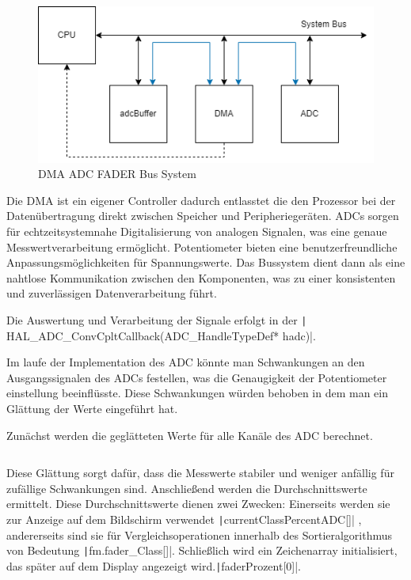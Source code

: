 \begin{figure}[H]
\centering
\includegraphics[width=1.0\textwidth]{images/08_durchfuehrung/interface/DMA_ADC_MEM.drawio.png}
\caption{DMA ADC FADER Bus System}
\label{fig:DMA ADC FADER}
\end{figure}

Die DMA ist ein eigener Controller dadurch entlasstet die den Prozessor bei der Datenübertragung direkt zwischen Speicher und Peripheriegeräten.
ADCs sorgen für echtzeitsystemnahe Digitalisierung von analogen Signalen, was eine genaue Messwertverarbeitung ermöglicht. Potentiometer bieten eine benutzerfreundliche Anpassungsmöglichkeiten für Spannungswerte. Das Bussystem dient dann als eine nahtlose Kommunikation zwischen den Komponenten, was zu einer konsistenten und zuverlässigen Datenverarbeitung führt.

\newpage
Die Auswertung und Verarbeitung der Signale erfolgt in der  \texttt| HAL_ADC_ConvCpltCallback(ADC_HandleTypeDef* hadc)|.

Im laufe der Implementation des ADC könnte man Schwankungen an den Ausgangssignalen des ADCs festellen, was die Genaugigkeit der Potentiometer einstellung beeinflüsste. Diese Schwankungen würden behoben in dem man ein Glättung der Werte eingeführt hat.

Zunächst werden die geglätteten Werte für alle Kanäle des ADC berechnet.

 \inputminted[firstline=121, lastline=135]{c}{../../f401_display_encoder_fader_test/Core/Src/interface.c}

Diese Glättung sorgt dafür, dass die Messwerte stabiler und weniger anfällig für zufällige Schwankungen sind. Anschließend werden die Durchschnittswerte ermittelt. Diese Durchschnittswerte dienen zwei Zwecken: Einerseits werden sie zur Anzeige auf dem Bildschirm verwendet  \texttt|currentClassPercentADC[]|
, andererseits sind sie für Vergleichsoperationen innerhalb des Sortieralgorithmus von Bedeutung  \texttt|fm.fader_Class[]|.
 Schließlich wird ein Zeichenarray initialisiert, das später auf dem Display angezeigt wird.\texttt|faderProzent[0]|.
 
